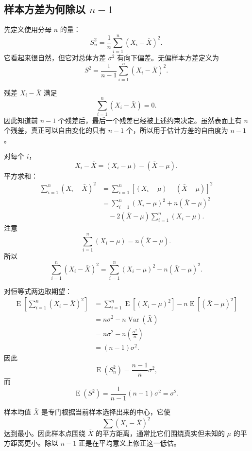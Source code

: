 \documentclass[11pt,a4paper]{article}
\newcommand{\E}{\operatorname{E}}
\newcommand{\Var}{\operatorname{Var}}
\begin{document}
\subsection{样本方差为何除以 \texorpdfstring{$n-1$}{n-1}}

先定义使用分母 $n$ 的量：
\[
  S_n^2
  =
  \frac1n\sum_{i=1}^n(X_i-\bar X)^2.
\]
它看起来很自然，但它对总体方差 $\sigma^2$ 有向下偏差。无偏样本方差定义为
\[
  \boxed{
  S^2
  =
  \frac1{n-1}\sum_{i=1}^n(X_i-\bar X)^2.
  }
\]

\begin{intuitionbox}[自由度直觉]
残差 $X_i-\bar X$ 满足
\[
  \sum_{i=1}^n(X_i-\bar X)=0.
\]
因此知道前 $n-1$ 个残差后，最后一个残差已经被上述约束决定。虽然表面上有 $n$ 个残差，真正可以自由变化的只有 $n-1$ 个，所以用于估计方差的自由度为 $n-1$。
\end{intuitionbox}

\begin{proofbox}[关键恒等式]
对每个 $i$，
\[
  X_i-\bar X
  =
  (X_i-\mu)-(\bar X-\mu).
\]
平方求和：
\[
\begin{aligned}
  \sum_{i=1}^n(X_i-\bar X)^2
  &=
  \sum_{i=1}^n
  \left[(X_i-\mu)-(\bar X-\mu)\right]^2\\
  &=
  \sum_{i=1}^n(X_i-\mu)^2
  {}+n(\bar X-\mu)^2\\
  &\quad
  -2(\bar X-\mu)\sum_{i=1}^n(X_i-\mu).
\end{aligned}
\]
注意
\[
  \sum_{i=1}^n(X_i-\mu)
  =
  n(\bar X-\mu).
\]
所以
\[
  \boxed{
  \sum_{i=1}^n(X_i-\bar X)^2
  =
  \sum_{i=1}^n(X_i-\mu)^2
  -
  n(\bar X-\mu)^2.
  }
\]
\end{proofbox}

对恒等式两边取期望：
\[
\begin{aligned}
  \E\left[
  \sum_{i=1}^n(X_i-\bar X)^2
  \right]
  &=
  \sum_{i=1}^n\E[(X_i-\mu)^2]
  -
  n\E[(\bar X-\mu)^2]\\
  &=
  n\sigma^2
  -
  n\Var(\bar X)\\
  &=
  n\sigma^2
  -
  n\left(\frac{\sigma^2}{n}\right)\\
  &=
  (n-1)\sigma^2.
\end{aligned}
\]
因此
\[
  \E(S_n^2)
  =
  \frac{n-1}{n}\sigma^2,
\]
而
\[
  \boxed{
  \E(S^2)
  =
  \frac1{n-1}(n-1)\sigma^2
  =
  \sigma^2.
  }
\]

\begin{intuitionbox}[为什么用样本均值会低估波动]
样本均值 $\bar X$ 是专门根据当前样本选择出来的中心，它使
\[
  \sum(X_i-\bar X)^2
\]
达到最小。因此样本点围绕 $\bar X$ 的平方距离，通常比它们围绕真实但未知的 $\mu$ 的平方距离更小。除以 $n-1$ 正是在平均意义上修正这一低估。
\end{intuitionbox}
\end{document}
